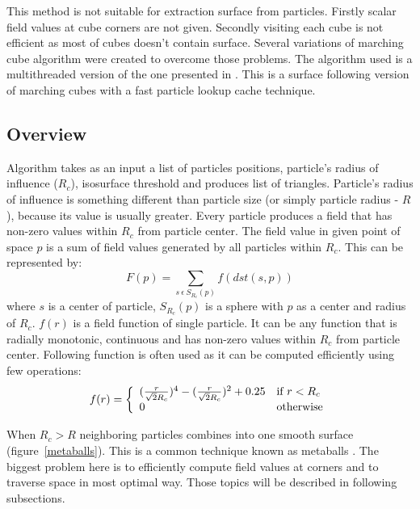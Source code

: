This method is not suitable for extraction surface from particles. Firstly scalar field values at cube corners are not given. Secondly visiting each cube is not efficient as most of cubes doesn't contain surface. Several variations of marching cube algorithm were created to overcome those problems. The algorithm used is a multithreaded version of the one presented in \cite{RosenbergBirdwell2008}. This is a surface following version of marching cubes with a fast particle lookup cache technique. 

\subsection{Overview} \label{sec:iso_overview}
Algorithm takes as an input a list of particles positions, particle's radius of influence ($R_c$), isosurface threshold and produces list of triangles. Particle's radius of influence is something different than particle size (or simply particle radius - $R$), because its value is usually greater. Every particle produces a field that has non-zero values within $R_c$ from particle center. The field value in given point of space $p$ is a sum of field values generated by all particles within $R_c$. This can be represented by:
\begin{equation}
\label{eq:field_equation}
F(p) = \sum_{s~\epsilon~S_{R_c}(p)} f(dst(s, p))
\end{equation}
where $s$ is a center of particle, $S_{R_c}(p)$ is a sphere with $p$ as a center and radius of $R_c$. $f(r)$ is a field function of single particle. It can be any function that is radially monotonic, continuous and has non-zero values within $R_c$ from particle center. Following function is often used as it can be computed efficiently using few operations:
\begin{equation}
\label{eq:single_field_equation}
f(r) = \left\{ \begin{array}{ll}
({r \over \sqrt{2}R_c} )^4 - ( {r \over \sqrt{2}R_c} )^2 + 0.25 & \textrm{if $r < R_c$}\\
0 & \textrm{otherwise}\\
\end{array} \right.
\end{equation}

When $R_c > R$ neighboring particles combines into one smooth surface  (figure~\ref{metaballs}). This is a common technique known as metaballs \cite{Blinn1982}. The biggest problem here is to efficiently compute field values at corners and to traverse space in most optimal way. Those topics will be described in following subsections.
 
